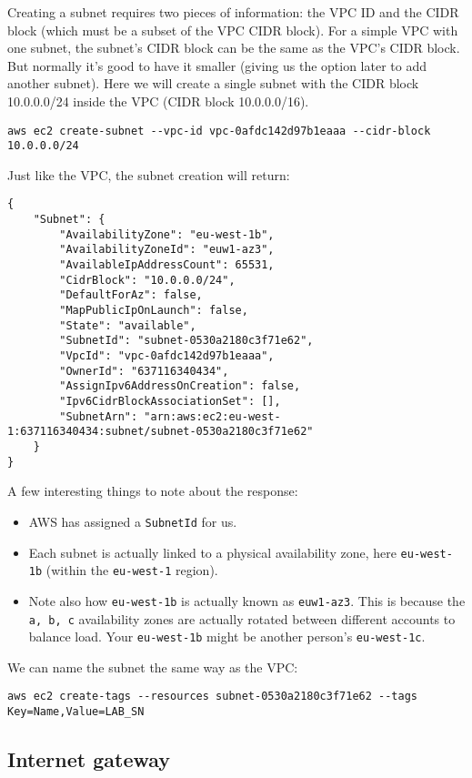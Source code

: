 \documentclass{pgnotes}
\begin{document}
Creating a subnet requires two pieces of information: the VPC ID and the CIDR block (which must be a subset of the VPC CIDR block).
For a simple VPC with one subnet, the subnet's CIDR block can be the same as the VPC's CIDR block.
But normally it's good to have it smaller (giving us the option later to add another subnet).
Here we will create a single subnet with the CIDR block 10.0.0.0/24 inside the VPC (CIDR block 10.0.0.0/16).
\begin{verbatim}
aws ec2 create-subnet --vpc-id vpc-0afdc142d97b1eaaa --cidr-block 10.0.0.0/24
\end{verbatim}
Just like the VPC, the subnet creation will return:
\begin{verbatim}
{
    "Subnet": {
        "AvailabilityZone": "eu-west-1b",
        "AvailabilityZoneId": "euw1-az3",
        "AvailableIpAddressCount": 65531,
        "CidrBlock": "10.0.0.0/24",
        "DefaultForAz": false,
        "MapPublicIpOnLaunch": false,
        "State": "available",
        "SubnetId": "subnet-0530a2180c3f71e62",
        "VpcId": "vpc-0afdc142d97b1eaaa",
        "OwnerId": "637116340434",
        "AssignIpv6AddressOnCreation": false,
        "Ipv6CidrBlockAssociationSet": [],
        "SubnetArn": "arn:aws:ec2:eu-west-1:637116340434:subnet/subnet-0530a2180c3f71e62"
    }
}
\end{verbatim}
A few interesting things to note about the response:
\begin{itemize}
\item AWS has assigned a \texttt{SubnetId} for us.
\item Each subnet is actually linked to a physical availability zone, here \texttt{eu-west-1b} (within the \texttt{eu-west-1} region).
\item Note also how \texttt{eu-west-1b} is actually known as \texttt{euw1-az3}.
  This is because the \texttt{a, b, c} availability zones are actually rotated between different accounts to balance load.
  Your \texttt{eu-west-1b} might be another person's \texttt{eu-west-1c}. 
\end{itemize}

We can name the subnet the same way as the VPC:
\begin{verbatim}
aws ec2 create-tags --resources subnet-0530a2180c3f71e62 --tags Key=Name,Value=LAB_SN
\end{verbatim}

\subsection{Internet gateway}
\end{document}

